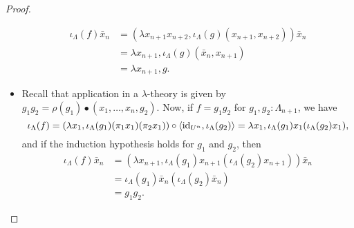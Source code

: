 \begin{proof}
\begin{itemize}
      \begin{align*}
        \iota_\Lambda(f) \bar x_n
        &= (\lambda x_{n + 1} x_{n + 2}, \iota_\Lambda(g) (x_{n + 1}, x_{n + 2})) \bar x_n\\
        &= \lambda x_{n + 1}, \iota_\Lambda(g) (\bar x_n, x_{n + 1})\\
        &= \lambda x_{n + 1}, g.
      \end{align*}
    \item Recall that application in a $ \lambda $-theory is given by $ g_1 g_2 = \rho(g_1) \bullet (x_1, \dots, x_n, g_2) $. Now, if $ f = g_1 g_2 $ for $ g_1, g_2 : \Lambda_{n + 1} $, we have
      \[
        \iota_\Lambda(f)
        = (\lambda x_1, \iota_\Lambda(g_1) (\pi_1 x_1) (\pi_2 x_1)) \circ \langle \text{id}_{U^n}, \iota_\Lambda(g_2) \rangle
        = \lambda x_1, \iota_\Lambda(g_1) x_1 (\iota_\Lambda(g_2) x_1),
      \]
      and if the induction hypothesis holds for $ g_1 $ and $ g_2 $, then
      \begin{align*}
        \iota_\Lambda(f) \bar x_n
        &= (\lambda x_{n + 1}, \iota_\Lambda(g_1) x_{n + 1} (\iota_\Lambda(g_2) x_{n + 1})) \bar x_n\\
        &= \iota_\Lambda(g_1) \bar x_n (\iota_\Lambda(g_2) \bar x_n)\\
        &= g_1 g_2.
      \end{align*}
  \end{itemize}
\end{proof}

